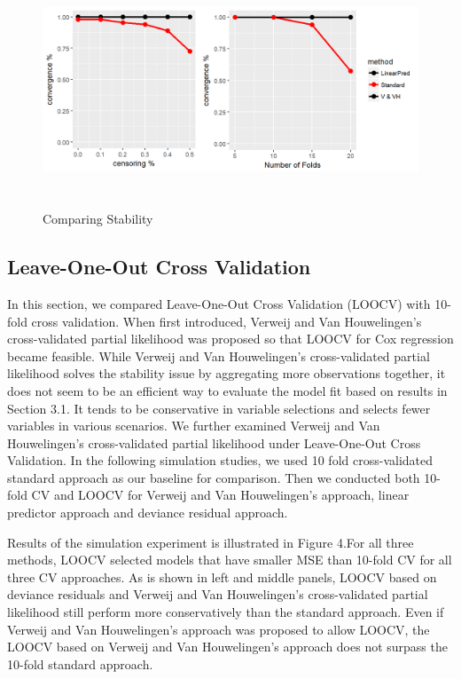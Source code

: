 \begin{figure}[h]
    \centering
		\includegraphics[height= 7cm ]{./figures/figure_3.png}
    \caption{Comparing Stability}
\end{figure}	

    \subsection {Leave-One-Out Cross Validation}
	\par In this section, we compared Leave-One-Out Cross Validation (LOOCV) with 10-fold cross validation. When first introduced, Verweij and Van Houwelingen's cross-validated partial likelihood was proposed so that LOOCV for Cox regression became feasible. While Verweij and Van Houwelingen's cross-validated partial likelihood solves the stability issue by aggregating more observations together, it does not seem to be an efficient way to evaluate the model fit based on results in Section 3.1. It tends to be conservative in variable selections and selects fewer variables in various scenarios. We further examined Verweij and Van Houwelingen's cross-validated partial likelihood under Leave-One-Out Cross Validation. In the following simulation studies, we used 10 fold cross-validated standard approach as our baseline for comparison. Then we conducted both 10-fold CV and LOOCV for Verweij and Van Houwelingen's approach, linear predictor approach and deviance residual approach.
	\par Results of the simulation experiment is illustrated in Figure 4.For all three methods, LOOCV selected models that have smaller MSE than 10-fold CV for all three CV approaches. As is shown in left and middle panels, LOOCV based on deviance residuals and Verweij and Van Houwelingen's cross-validated partial likelihood still perform more conservatively than the standard approach. Even if Verweij and Van Houwelingen's approach was proposed to allow LOOCV, the LOOCV based on Verweij and Van Houwelingen's approach does not surpass the 10-fold standard approach.

